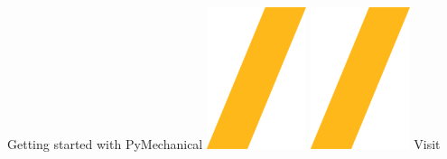 \documentclass[9pt,landscape]{article}
\begin{document}
\vspace{-0.45cm}
\noindent\makebox[\linewidth]{\rule{\paperwidth}{3pt}}
\begin{center}
Getting started with PyMechanical \includegraphics[height=\fontcharht\font`\S]{slash.png} \href{https://github.com/ansys/pymechanical}{\color{blue}{PyMechanical on GitHub}}
\includegraphics[height=\fontcharht\font`\S]{slash.png} Visit \href{https://mechanical.docs.pyansys.com/}{\color{blue}{mechanical.docs.pyansys.com}}
\end{center}
\end{document}
